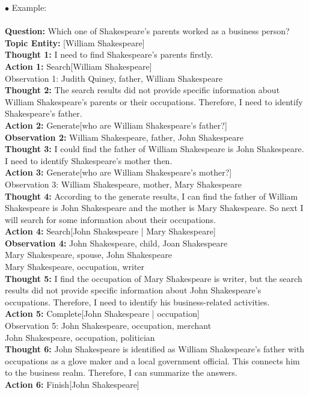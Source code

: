 \begin{tcolorbox}
$\bullet$ Example: \\ \\
\textbf{Question:} Which one of Shakespeare's parents worked as a business person? \\
\textbf{Topic Entity:} [William Shakespeare] \\
\textbf{Thought 1:} I need to find Shakespeare's parents firstly. \\
\textbf{Action 1:} Search[William Shakespeare] \\
Observation 1: Judith Quiney, father, William Shakespeare \\
\textbf{Thought 2:} The search results did not provide specific information about William Shakespeare's parents or their occupations. Therefore, I need to identify Shakespeare's father. \\
\textbf{Action 2:} Generate[who are William Shakespeare's father?] \\
\textbf{Observation 2:} William Shakespeare, father, John Shakespeare \\
\textbf{Thought 3:} I could find the father of William Shakespeare is John Shakespeare. I need to identify Shakespeare's mother then. \\
\textbf{Action 3:} \textcolor[rgb]{0.7529,0,0}{Generate[who are William Shakespeare's mother?]} \\
Observation 3: William Shakespeare, mother, Mary Shakespeare \\
\textbf{Thought 4:} According to the generate results, I can find the father of William Shakespeare is John Shakespeare and the mother is Mary Shakespeare. So next I will search for some information about their occupations. \\
\textbf{Action 4:} Search[John Shakespeare | Mary Shakespeare] \\
\textbf{Observation 4:} John Shakespeare, child, Joan Shakespeare \\
Mary Shakespeare, spouse, John Shakespeare \\
Mary Shakespeare, occupation, writer \\
\textbf{Thought 5:} I find the occupation of Mary Shakespeare is writer, but the search results did not provide specific information about John Shakespeare's occupations. Therefore, I need to identify his business-related activities. \\
\textbf{Action 5:} \textcolor[rgb]{0.4549,0.7137,0.0078}{Complete[John Shakespeare | occupation]} \\
Observation 5: \textcolor[rgb]{0,0.4392,0.7529}{John Shakespeare}, occupation, merchant \\
John Shakespeare, occupation, politician \\
\textbf{Thought 6:} John Shakespeare is identified as William Shakespeare's father with occupations as a glove maker and a local government official. This connects him to the business realm. Therefore, I can summarize the answers. \\
\textbf{Action 6:} Finish[John Shakespeare]


\end{tcolorbox}

